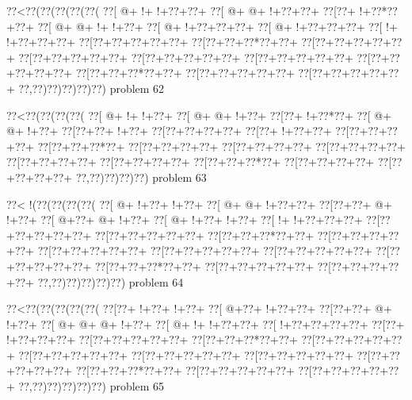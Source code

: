 \vbox{\vbox{\goo
\0??<\0??(\0??(\0??(\0??(\0??(
\0??[\- @+\- !+\- !+\0??+\0??+
\0??[\- @+\- @+\- !+\0??+\0??+
\0??[\0??+\- !+\0??*\0??+\0??+
\0??[\- @+\- @+\- !+\- !+\0??+
\0??[\- @+\- !+\0??+\0??+\0??+
\0??[\- @+\- !+\0??+\0??+\0??+
\0??[\- !+\- !+\0??+\0??+\0??+
\0??[\0??+\0??+\0??+\0??+\0??+
\0??[\0??+\0??+\0??*\0??+\0??+
\0??[\0??+\0??+\0??+\0??+\0??+
\0??[\0??+\0??+\0??+\0??+\0??+
\0??[\0??+\0??+\0??+\0??+\0??+
\0??[\0??+\0??+\0??+\0??+\0??+
\0??[\0??+\0??+\0??+\0??+\0??+
\0??[\0??+\0??+\0??*\0??+\0??+
\0??[\0??+\0??+\0??+\0??+\0??+
\0??[\0??+\0??+\0??+\0??+\0??+
\0??,\0??)\0??)\0??)\0??)\0??)
}
\hfil problem 62\hfil\break
}

\vbox{\vbox{\goo
\0??<\0??(\0??(\0??(\0??(
\0??[\- @+\- !+\- !+\0??+
\0??[\- @+\- @+\- !+\0??+
\0??[\0??+\- !+\0??*\0??+
\0??[\- @+\- @+\- !+\0??+
\0??[\0??+\0??+\- !+\0??+
\0??[\0??+\0??+\0??+\0??+
\0??[\0??+\- !+\0??+\0??+
\0??[\0??+\0??+\0??+\0??+
\0??[\0??+\0??+\0??*\0??+
\0??[\0??+\0??+\0??+\0??+
\0??[\0??+\0??+\0??+\0??+
\0??[\0??+\0??+\0??+\0??+
\0??[\0??+\0??+\0??+\0??+
\0??[\0??+\0??+\0??+\0??+
\0??[\0??+\0??+\0??*\0??+
\0??[\0??+\0??+\0??+\0??+
\0??[\0??+\0??+\0??+\0??+
\0??,\0??)\0??)\0??)\0??)
}
\hfil problem 63\hfil\break
}

\vbox{\vbox{\goo
\0??<\- !(\0??(\0??(\0??(\0??(
\0??[\- @+\- !+\0??+\- !+\0??+
\0??[\- @+\- @+\- !+\0??+\0??+
\0??[\0??+\0??+\- @+\- !+\0??+
\0??[\- @+\0??+\- @+\- !+\0??+
\0??[\- @+\- !+\0??+\- !+\0??+
\0??[\- !+\- !+\0??+\0??+\0??+
\0??[\0??+\0??+\0??+\0??+\0??+
\0??[\0??+\0??+\0??+\0??+\0??+
\0??[\0??+\0??+\0??*\0??+\0??+
\0??[\0??+\0??+\0??+\0??+\0??+
\0??[\0??+\0??+\0??+\0??+\0??+
\0??[\0??+\0??+\0??+\0??+\0??+
\0??[\0??+\0??+\0??+\0??+\0??+
\0??[\0??+\0??+\0??+\0??+\0??+
\0??[\0??+\0??+\0??*\0??+\0??+
\0??[\0??+\0??+\0??+\0??+\0??+
\0??[\0??+\0??+\0??+\0??+\0??+
\0??,\0??)\0??)\0??)\0??)\0??)
}
\hfil problem 64\hfil\break
}

\vbox{\vbox{\goo
\0??<\0??(\0??(\0??(\0??(\0??(
\0??[\0??+\- !+\0??+\- !+\0??+
\0??[\- @+\0??+\- !+\0??+\0??+
\0??[\0??+\0??+\- @+\- !+\0??+
\0??[\- @+\- @+\- @+\- !+\0??+
\0??[\- @+\- !+\- !+\0??+\0??+
\0??[\- !+\0??+\0??+\0??+\0??+
\0??[\0??+\- !+\0??+\0??+\0??+
\0??[\0??+\0??+\0??+\0??+\0??+
\0??[\0??+\0??+\0??*\0??+\0??+
\0??[\0??+\0??+\0??+\0??+\0??+
\0??[\0??+\0??+\0??+\0??+\0??+
\0??[\0??+\0??+\0??+\0??+\0??+
\0??[\0??+\0??+\0??+\0??+\0??+
\0??[\0??+\0??+\0??+\0??+\0??+
\0??[\0??+\0??+\0??*\0??+\0??+
\0??[\0??+\0??+\0??+\0??+\0??+
\0??[\0??+\0??+\0??+\0??+\0??+
\0??,\0??)\0??)\0??)\0??)\0??)
}
\hfil problem 65\hfil\break
}

